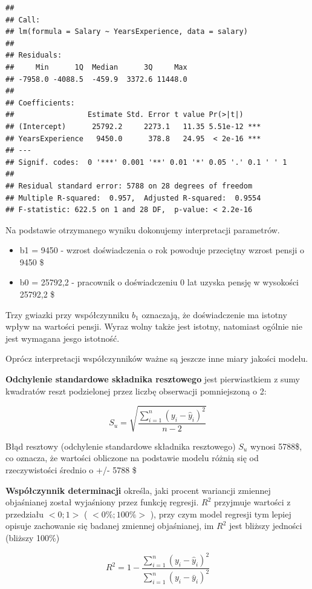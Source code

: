 \documentclass[]{book}
\providecommand{\tightlist}{%
  \setlength{\itemsep}{0pt}\setlength{\parskip}{0pt}}
\begin{document}
\begin{verbatim}
## 
## Call:
## lm(formula = Salary ~ YearsExperience, data = salary)
## 
## Residuals:
##     Min      1Q  Median      3Q     Max 
## -7958.0 -4088.5  -459.9  3372.6 11448.0 
## 
## Coefficients:
##                 Estimate Std. Error t value Pr(>|t|)    
## (Intercept)      25792.2     2273.1   11.35 5.51e-12 ***
## YearsExperience   9450.0      378.8   24.95  < 2e-16 ***
## ---
## Signif. codes:  0 '***' 0.001 '**' 0.01 '*' 0.05 '.' 0.1 ' ' 1
## 
## Residual standard error: 5788 on 28 degrees of freedom
## Multiple R-squared:  0.957,  Adjusted R-squared:  0.9554 
## F-statistic: 622.5 on 1 and 28 DF,  p-value: < 2.2e-16
\end{verbatim}

Na podstawie otrzymanego wyniku dokonujemy interpretacji parametrów.

\begin{itemize}
\tightlist
\item
  b1 = 9450 - wzrost doświadczenia o rok powoduje przeciętny wzrost pensji o 9450 \$
\item
  b0 = 25792,2 - pracownik o doświadczeniu 0 lat uzyska pensję w wysokości 25792,2 \$
\end{itemize}

Trzy gwiazki przy współczynniku \(b_1\) oznaczają, że doświadczenie ma istotny wpływ na wartości pensji. Wyraz wolny także jest istotny, natomiast ogólnie nie jest wymagana jesgo istotność.

Oprócz interpretacji współczynników ważne są jeszcze inne miary jakości modelu.

\textbf{Odchylenie standardowe składnika resztowego} jest pierwiastkiem z sumy kwadratów reszt podzielonej przez liczbę obserwacji pomniejszoną o 2:

\[S_{u}=\sqrt{\frac{\sum\limits_{i=1}^{n}{(y_{i}-\hat{y}_{i})^2}}{n-2}}\]

Błąd resztowy (odchylenie standardowe składnika resztowego) \(S_u\) wynosi 5788\$, co oznacza, że wartości obliczone na podstawie modelu różnią się od rzeczywistości średnio o +/- 5788
\$

\textbf{Współczynnik determinacji} określa, jaki procent wariancji zmiennej objaśnianej został wyjaśniony przez funkcję regresji. \(R^2\) przyjmuje wartości z przedziału \(<0;1>\) ( \(<0\%;100\%>\) ), przy czym model regresji tym lepiej opisuje zachowanie się badanej zmiennej objaśnianej, im \(R^2\) jest bliższy jedności (bliższy 100\%)

\[R^2=1-\frac{\sum\limits_{i=1}^{n}{(y_{i}-\hat{y}_{i})^2}}{\sum\limits_{i=1}^{n}{(y_{i}-\bar{y}_{i})^2}}\]
\end{document}
